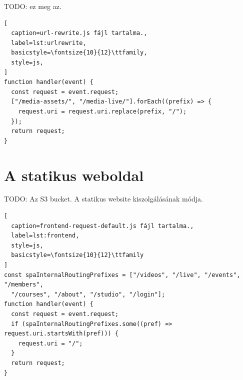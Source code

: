 TODO: ez meg az.

\begin{lstlisting}[
  caption=url-rewrite.js fájl tartalma.,
  label=lst:urlrewrite,
  basicstyle=\fontsize{10}{12}\ttfamily,
  style=js,
]
function handler(event) {
  const request = event.request;
  ["/media-assets/", "/media-live/"].forEach((prefix) => {
    request.uri = request.uri.replace(prefix, "/");
  });
  return request;
}
\end{lstlisting}

\section{A statikus weboldal}

TODO: Az S3 bucket. A statikus website kiszolgálásának módja.

\begin{lstlisting}[
  caption=frontend-request-default.js fájl tartalma.,
  label=lst:frontend,
  style=js,
  basicstyle=\fontsize{10}{12}\ttfamily
]
const spaInternalRoutingPrefixes = ["/videos", "/live", "/events", "/members", 
  "/courses", "/about", "/studio", "/login"];
function handler(event) {
  const request = event.request;
  if (spaInternalRoutingPrefixes.some((pref) => request.uri.startsWith(pref))) {
    request.uri = "/";
  }
  return request;
}
\end{lstlisting}

